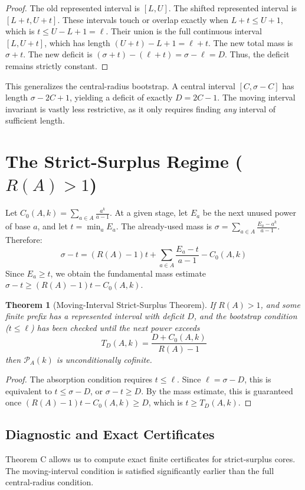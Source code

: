 \documentclass[12pt,reqno]{amsart}
\newtheorem{theorem}{Theorem}[section]
\theoremstyle{definition}
\begin{document}
\begin{proof}
The old represented interval is $[L, U]$. The shifted represented interval is $[L+t, U+t]$. These intervals touch or overlap exactly when $L+t \le U+1$, which is $t \le U - L + 1 = \ell$. Their union is the full continuous interval $[L, U+t]$, which has length $(U+t) - L + 1 = \ell + t$. The new total mass is $\sigma + t$. The new deficit is $(\sigma + t) - (\ell + t) = \sigma - \ell = D$. Thus, the deficit remains strictly constant.
\end{proof}

This generalizes the central-radius bootstrap. A central interval $[C, \sigma-C]$ has length $\sigma - 2C + 1$, yielding a deficit of exactly $D = 2C - 1$. The moving interval invariant is vastly less restrictive, as it only requires finding \textit{any} interval of sufficient length.

\section{The Strict-Surplus Regime ($R(A) > 1$)}

Let $C_0(A,k) = \sum_{a \in A} \frac{a^k}{a-1}$. At a given stage, let $E_a$ be the next unused power of base $a$, and let $t = \min_a E_a$. The already-used mass is $\sigma = \sum_{a \in A} \frac{E_a - a^k}{a-1}$.
Therefore:
\[ \sigma - t = (R(A)-1)t + \sum_{a \in A} \frac{E_a - t}{a-1} - C_0(A,k) \]
Since $E_a \ge t$, we obtain the fundamental mass estimate $\sigma - t \ge (R(A)-1)t - C_0(A,k)$.

\begin{theorem}[Moving-Interval Strict-Surplus Theorem]
If $R(A) > 1$, and some finite prefix has a represented interval with deficit $D$, and the bootstrap condition ($t \le \ell$) has been checked until the next power exceeds
\[ T_D(A,k) = \frac{D + C_0(A,k)}{R(A) - 1} \]
then $\mathcal{P}_A(k)$ is unconditionally cofinite.
\end{theorem}

\begin{proof}
The absorption condition requires $t \le \ell$. Since $\ell = \sigma - D$, this is equivalent to $t \le \sigma - D$, or $\sigma - t \ge D$. By the mass estimate, this is guaranteed once $(R(A)-1)t - C_0(A,k) \ge D$, which is $t \ge T_D(A,k)$.
\end{proof}

\subsection{Diagnostic and Exact Certificates}
Theorem C allows us to compute exact finite certificates for strict-surplus cores. The moving-interval condition is satisfied significantly earlier than the full central-radius condition.
\end{document}
